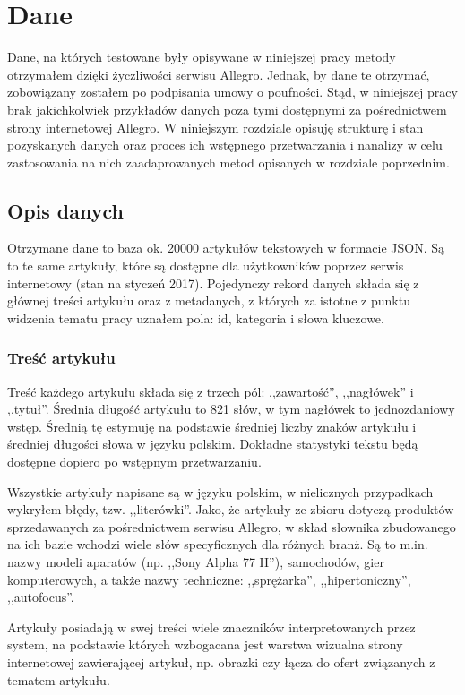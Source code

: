\documentclass[pl]{minipw} %
\begin{document}
\chapter{Dane}

Dane, na których testowane były opisywane w niniejszej pracy metody otrzymałem dzięki życzliwości serwisu Allegro. Jednak, by dane te otrzymać, zobowiązany zostałem po podpisania umowy o poufności. Stąd, w niniejszej pracy brak jakichkolwiek przykładów danych poza tymi dostępnymi za pośrednictwem strony internetowej Allegro. W niniejszym rozdziale opisuję strukturę i stan pozyskanych danych oraz proces ich wstępnego przetwarzania i nanalizy w celu zastosowania na nich zaadaprowanych metod opisanych w rozdziale poprzednim. 

\section{Opis danych}

Otrzymane dane to baza ok. 20000 artykułów tekstowych w formacie JSON. Są to te same artykuły, które są dostępne dla użytkowników poprzez serwis internetowy (stan na styczeń 2017). Pojedynczy rekord danych składa się z głównej treści artykułu oraz z metadanych, z których za istotne z punktu widzenia tematu pracy uznałem pola: id, kategoria i słowa kluczowe.

\subsection{Treść artykułu}

Treść każdego artykułu składa się z trzech pól: ,,zawartość'', ,,nagłówek'' i ,,tytuł''. Średnia długość artykułu to 821 słów, w tym nagłówek to jednozdaniowy wstęp. Średnią tę estymuję na podstawie średniej liczby znaków artykułu i średniej długości słowa w języku polskim. Dokładne statystyki tekstu będą dostępne dopiero po wstępnym przetwarzaniu.

Wszystkie artykuły napisane są w języku polskim, w nielicznych przypadkach wykryłem błędy, tzw. ,,literówki''. Jako, że artykuły ze zbioru dotyczą produktów sprzedawanych za pośrednictwem serwisu Allegro, w skład słownika zbudowanego na ich bazie wchodzi wiele słów specyficznych dla różnych branż. Są to m.in. nazwy modeli aparatów (np. ,,Sony Alpha 77 II''), samochodów, gier komputerowych, a także nazwy techniczne: ,,sprężarka'', ,,hipertoniczny'', ,,autofocus''.

Artykuły posiadają w swej treści wiele znaczników interpretowanych przez system, na podstawie których wzbogacana jest warstwa wizualna strony internetowej zawierającej artykuł, np. obrazki czy łącza do ofert związanych z tematem artykułu.
\end{document}
